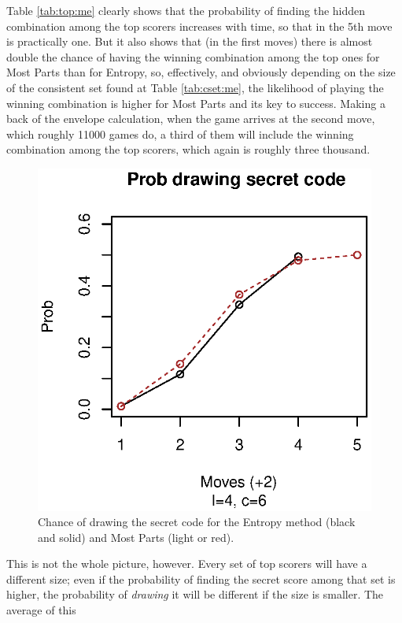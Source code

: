 \documentclass[preprint,12pt]{elsarticle}
\begin{document}
Table \ref{tab:top:me} clearly shows that the probability of finding
the hidden combination among the top scorers increases with time, so
that in the 5th move is practically one. But it also shows that (in the first moves) there
is almost double the chance of having the winning combination among the top
ones for Most Parts than for Entropy, so, effectively, and obviously
depending on the size of the consistent set found at Table 
\ref{tab:cset:me}, the likelihood of playing the winning combination
is higher for Most Parts and its key to success. Making a back of the
envelope calculation, when the game arrives at the second move, which
roughly 11000 games do, a third of them will include the winning
combination among the top scorers, which again is roughly three
thousand. 

%
\begin{figure}[!htb]
\centering\smallskip
\includegraphics{prob-me-46.eps}
\caption{Chance of drawing the secret code for the
  Entropy method (black and solid) and Most Parts (light or
  red). \label{fig:prob:me:46}}
\end{figure} 
This is not the whole picture, however. Every set of top scorers will
have a different size; even if the probability of finding the secret
score among that set is higher, the probability of {\em drawing} it
will be different if the size is smaller. The average of this
\end{document}
